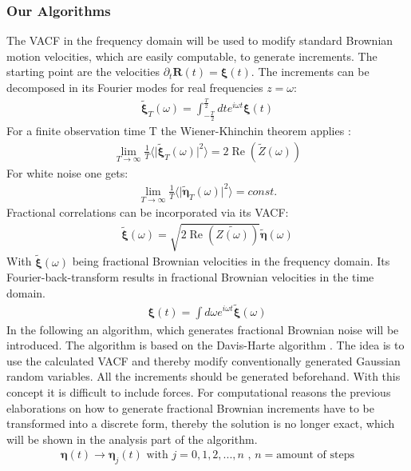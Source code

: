 \documentclass[
  a4paper,BCOR10mm,oneside,
  headsepline,footsepline,%
  fleqn,openbib
]{scrbook}
\begin{document}
\subsubsection{Our Algorithms}
The VACF in the frequency domain will be used to modify standard Brownian motion velocities, which are easily computable, to generate increments. The starting point are the velocities $\partial_t \bm{R}(t)=\bm{\xi}(t)$. The increments can be decomposed in its Fourier modes for real frequencies $z=\omega$:
\begin{align}
 \tilde{\bm{\xi}}_{T}(\omega)=\int_{-\frac{T}{2}}^{\frac{T}{2}} dt e^{i \omega t} \bm{\xi}(t) \label{eq:fourier}
\end{align}
For a finite observation time T the Wiener-Khinchin theorem applies :
\begin{align}
 \lim_{T\to\infty}\frac{1}{T}\langle \lvert  \tilde{\bm{\xi}}_{T}(\omega) \rvert^2  \rangle = 2  \operatorname{Re} \left(\tilde{Z}(\omega)\right)
\end{align}
For white noise one gets: 
\begin{align}
 \lim_{T\to\infty}\frac{1}{T}\langle \lvert  \tilde{\bm{\eta}}_{T}(\omega) \rvert^2 \rangle = const.
\end{align}
Fractional correlations can be incorporated via its VACF:
\begin{align}
\tilde{\bm{\xi}}(\omega) = \sqrt{2 \operatorname{Re} \left(\tilde{Z(\omega)}\right)}  \tilde{\bm{\eta}}(\omega) \label{eq:fracvacf}
\end{align}
 With $\tilde{\bm{\xi}}(\omega)$ being fractional Brownian velocities in the frequency domain. Its Fourier-back-transform results in fractional Brownian velocities in the time domain.
\begin{align}
\bm{\xi}(t)=\int d \omega e^{i \omega t} \tilde{\bm{\xi}}(\omega) \label{eq:fourier2}
\end{align}
In the following an algorithm, which generates fractional Brownian noise will be introduced. The algorithm is based on the Davis-Harte algorithm \cite{Craigmile2003}. The idea is to use the calculated VACF and thereby modify conventionally generated Gaussian random variables. All the increments should be generated beforehand. With this concept it is difficult to include forces. For computational reasons the previous elaborations on how to generate fractional Brownian increments have to be transformed into a discrete form, thereby the solution is no longer exact, which will be shown in the analysis part of the algorithm.  
\begin{align}
\bm{\eta} (t) \longrightarrow \bm{\eta}_j(t)  \text{  with  } j=0,1,2,...,n  \text{  ,  } n= \text{amount of steps}
\end{align}
\end{document}
